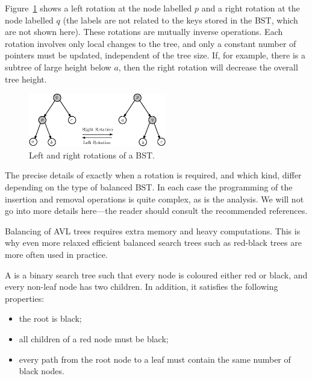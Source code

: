 \begin{Example}\label{ex:rotation}
Figure~\ref{fig:treerotation} shows a left rotation at the node labelled $p$ and 
a right rotation at the node labelled $q$ (the labels are not related to the 
keys stored in the BST, which are not shown here). These rotations are mutually 
inverse operations. Each rotation involves only local changes to the tree, 
and only a constant number of pointers must be updated, independent of the tree 
size. If, for example, there is a subtree of large height below $a$, then the 
right rotation will decrease the overall tree height.

\begin{figure}[htb]
\begin{center}
\includegraphics[width=6cm]{figs/treerotation}
\caption{\label{fig:treerotation}Left and right rotations of a BST.}
\end{center}
\end{figure}

\end{Example}

The precise details of exactly when a rotation is required, and which kind, 
differ depending on the type of balanced BST. In each case the programming of
the insertion and removal operations is quite complex, as is the analysis. 
We will not go into more details here---the reader should consult the  
recommended references.

Balancing of AVL trees requires extra memory and heavy
computations. This is why even more relaxed efficient balanced search
trees such as red-black trees are more often used in practice.

\begin{Definition}
A  is a binary search tree such that 
every node is coloured either red or black, and every non-leaf node 
has two children. In addition, it satisfies the following properties: 
\begin{itemize}
\item the root is black;
\item all children of a red node must be black;
\item every path from the root node to a leaf must contain the same number of 
black nodes.
\end{itemize}
\end{Definition}

